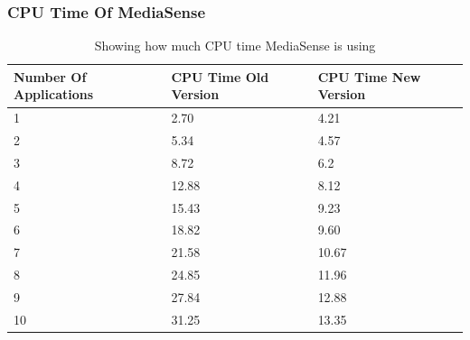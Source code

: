\subsubsection{CPU Time Of MediaSense}
\begin{table}[H]
\begin{center}
    \begin{tabular}[t!]{ | l | l | l |}
    \hline
    Number Of Applications								& CPU Time Old Version					& CPU Time New Version\\ \hline
    1 													& 2.70									& 4.21\\ \hline
    2 													& 5.34									& 4.57\\ \hline
    3 													& 8.72									& 6.2\\ \hline
    4 													& 12.88									& 8.12\\ \hline
    5 													& 15.43									& 9.23\\ \hline
    6 													& 18.82									& 9.60\\ \hline
    7 													& 21.58									& 10.67\\ \hline
    8 													& 24.85									& 11.96\\ \hline
    9 													& 27.84									& 12.88	\\ \hline
    10 													& 31.25									& 13.35\\ \hline
    \end{tabular}
    \caption{Showing how much CPU time MediaSense is using}
    \label{tab:cpu}
\end{center}
\end{table}
\clearpage

